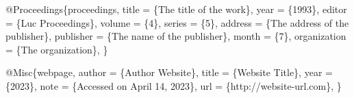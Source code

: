 \documentclass[
  stu,
  floatsintext,
  longtable,
  a4paper,
  nolmodern,
  notxfonts,
  notimes,
  colorlinks=true,linkcolor=black,citecolor=black,urlcolor=black]{apa7}
\newenvironment{Shaded}{\begin{snugshade}}{\end{snugshade}}
\newcommand{\NormalTok}[1]{\textcolor[rgb]{0.00,0.23,0.31}{#1}}
\begin{document}
\begin{Shaded}
\begin{Highlighting}[]
\NormalTok{    @Proceedings\{proceedings,}
\NormalTok{        title        = \{The title of the work\},}
\NormalTok{        year         = \{1993\},}
\NormalTok{        editor       = \{Luc Proceedings\},}
\NormalTok{        volume       = \{4\},}
\NormalTok{        series       = \{5\},}
\NormalTok{        address      = \{The address of the publisher\},}
\NormalTok{        publisher    = \{The name of the publisher\},}
\NormalTok{        month        = \{7\},}
\NormalTok{        organization = \{The organization\},}
\NormalTok{    \}}
    
\NormalTok{    @Misc\{webpage,}
\NormalTok{        author = \{Author Website\},}
\NormalTok{        title  = \{Website Title\},}
\NormalTok{        year   = \{2023\},}
\NormalTok{        note   = \{Accessed on April 14, 2023\},}
\NormalTok{        url    = \{http://website{-}url.com\},}
\NormalTok{    \}}
\end{Highlighting}
\end{Shaded}
\end{document}
